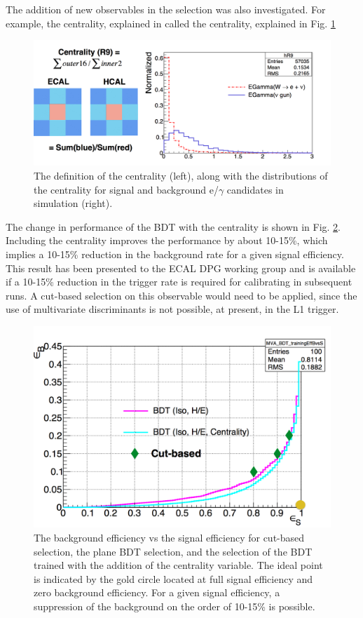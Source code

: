 The addition of new observables in the selection was also investigated. For example, the centrality, explained in  called the centrality, explained in Fig. \ref{fig:centrality}
\begin{figure}[h]
\centering
  \includegraphics[width=0.95\linewidth]{figures/CMS/EcalCentrality.png}
\caption{The definition of the centrality (left), along with the distributions of the centrality for signal and background e/$\gamma$ candidates in simulation (right). }
\label{fig:centrality}
\end{figure}
The change in performance of the BDT with the centrality is shown in Fig. \ref{fig:ECALMva3}. Including the centrality improves the performance by about 10-15\%, which implies a 10-15\% reduction in the background rate  for a given signal efficiency. This result has been presented to the ECAL DPG working group and is available if a 10-15\% reduction in the trigger rate is required for calibrating in subsequent runs. A cut-based selection on this observable would need to be applied, since the use of multivariate discriminants is not possible, at present, in the L1 trigger.
\begin{figure}[h]
\centering
  \includegraphics[width=0.79\linewidth]{figures/CMS/ECALMva3.png}
\caption{The background efficiency vs the signal efficiency for cut-based selection, the plane BDT selection, and the selection of the BDT trained with the addition of the centrality variable. The ideal point is indicated by the gold circle located at full signal efficiency and zero background efficiency. For a given signal efficiency, a suppression of the background on the order of 10-15\% is possible. }
\label{fig:ECALMva3}
\end{figure}
\FloatBarrier


